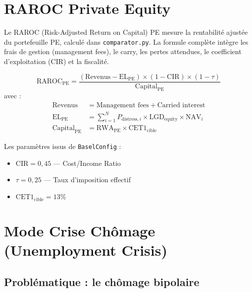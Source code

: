 \documentclass[12pt,a4paper]{article}
\begin{document}
\section{RAROC Private Equity}
\label{sec:raroc}

Le RAROC (Risk-Adjusted Return on Capital) PE mesure la rentabilit\'{e} ajust\'{e}e
du portefeuille PE, calcul\'{e} dans \texttt{comparator.py}. La formule compl\`{e}te
int\`{e}gre les frais de gestion (management fees), le carry, les pertes attendues,
le coefficient d'exploitation (CIR) et la fiscalit\'{e}.

\begin{formulebox}
\begin{equation}
\label{eq:raroc_pe}
\mathrm{RAROC}_{\mathrm{PE}} = \frac{(\mathrm{Revenus} - \mathrm{EL}_{\mathrm{PE}}) \times (1 - \mathrm{CIR}) \times (1 - \tau)}{\mathrm{Capital}_{\mathrm{PE}}}
\end{equation}
avec :
\begin{align}
\mathrm{Revenus} &= \text{Management fees} + \text{Carried interest} \\
\mathrm{EL}_{\mathrm{PE}} &= \sum_{i=1}^{N} P_{\mathrm{distress},i} \times \mathrm{LGD}_{\mathrm{equity}} \times \mathrm{NAV}_i \\
\mathrm{Capital}_{\mathrm{PE}} &= \mathrm{RWA}_{\mathrm{PE}} \times \mathrm{CET1}_{\mathrm{cible}}
\end{align}
\end{formulebox}

Les param\`{e}tres issus de \texttt{BaselConfig} :
\begin{itemize}[nosep]
    \item $\mathrm{CIR} = 0{,}45$ --- Cost/Income Ratio
    \item $\tau = 0{,}25$ --- Taux d'imposition effectif
    \item $\mathrm{CET1}_{\mathrm{cible}} = 13\%$
\end{itemize}


\section{Mode Crise Ch\^{o}mage (Unemployment Crisis)}
\label{sec:unemployment_crisis}

\subsection{Probl\'{e}matique : le ch\^{o}mage bipolaire}
\end{document}

